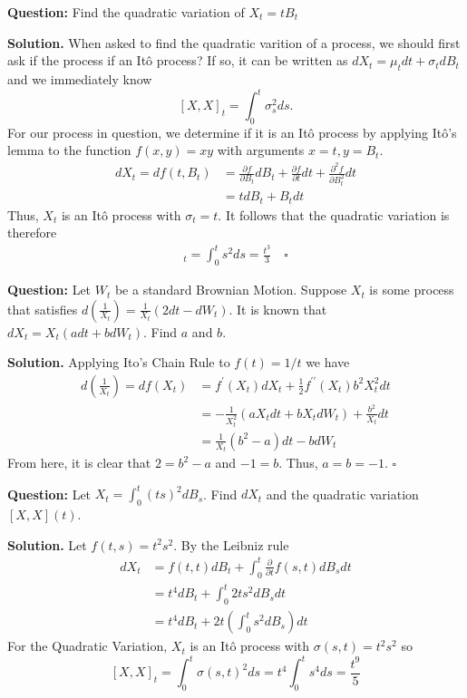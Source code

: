 \documentclass{article}
\begin{document}
\begin{tcolorbox}[colframe=black,colback=gray!5,boxrule=0.5pt]
\textbf{Question:} Find the quadratic variation of $X_t = tB_t$
\end{tcolorbox}
\textbf{Solution.} When asked to find the quadratic varition of a process, we should first ask if the process if an Itô process? If so, it can be written as $dX_t = \mu_t dt + \sigma_t dB_t$ and we immediately know 
$$[X, X]_t = \int_0^t\sigma_s^2ds.$$
For our process in question, we determine if it is an Itô process by applying Itô's lemma to the function $f(x,y) = xy$ with arguments $x=t, y=B_t$. 
\begin{align*}
    dX_t = df(t,B_t) &= \frac{\partial f}{\partial B_t}dB_t + \frac{\partial f}{\partial t}dt + \frac{\partial^2 f}{\partial B_t^2}dt \\
    &=tdB_t + B_tdt
\end{align*}
Thus, $X_t$ is an Itô process with $\sigma_t = t$. It follows that the quadratic variation is therefore
\begin{align*}
    [X,X]_t = \int_0^t s^2ds = \frac{t^3}{3} \quad \square
\end{align*}

\begin{tcolorbox}[colframe=black,colback=gray!5,boxrule=0.5pt]
\textbf{Question:} Let $W_t$ be a standard Brownian Motion. Suppose $X_t$ is some process that satisfies $d(\frac{1}{X_t}) = \frac{1}{X_t}(2dt-dW_t)$. It is known that $dX_t = X_t(adt + bdW_t)$. Find $a$ and $b$.
\end{tcolorbox}
\textbf{Solution.} Applying Ito's Chain Rule to $f(t) = 1/t$ we have 
\begin{align*}
    d\left(\frac{1}{X_t}\right) = df(X_t) &=  f^\prime(X_t)dX_t + \frac{1}{2}f^{\prime\prime}(X_t)b^2X_t^2dt \\
    &= -\frac{1}{X_t^2}(aX_tdt + bX_tdW_t) + \frac{b^2}{X_t}dt \\
&= \frac{1}{X_t}(b^2-a)dt-bdW_t
\end{align*}
From here, it is clear that $2 = b^2-a$ and $-1 = b$. Thus, $a=b=-1$. $\square$

\begin{tcolorbox}[colframe=black,colback=gray!5,boxrule=0.5pt]
\textbf{Question:} Let $X_t = \int_0^t (ts)^2dB_s$. Find $dX_t$ and the quadratic variation $[X,X](t)$.
\end{tcolorbox}
\textbf{Solution.} Let $f(t,s) = t^2s^2$. By the Leibniz rule 
\begin{align*}
    dX_t &= f(t,t)dB_t + \int_0^t \frac{\partial}{\partial t}f(s,t) dB_sdt  \\
         &= t^4dB_t + \int_0^t 2ts^2dB_sdt \\
         &= t^4dB_t + 2t \left(\int_0^t s^2dB_s\right)dt
\end{align*}
For the Quadratic Variation, $X_t$ is an Itô process with $\sigma(s,t) = t^2 s^2$ so
$$[X,X]_t = \int_0^t \sigma(s,t)^2 ds = t^4\int_0^t s^4ds = \frac{t^9}{5}$$
\end{document}
